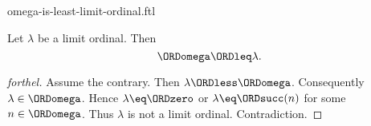 \documentclass{naproche-library}
\begin{document}
\begin{smodule}[title=$\omega$ is the Least Limit Ordinal]{omega-is-least-limit-ordinal.ftl}

\begin{proposition}[forthel,id=SET_THEORY_03_5517271459954688]
  Let $\lambda$ be a limit ordinal.
  Then \[ \ORDomega \ORDleq \lambda. \]
\end{proposition}
\begin{proof}[forthel]
  Assume the contrary.
  Then $\lambda \ORDless \ORDomega$.
  Consequently $\lambda \in \ORDomega$.
  Hence $\lambda \eq \ORDzero$ or $\lambda \eq \ORDsucc(n)$ for some $n \in \ORDomega$.
  Thus $\lambda$ is not a limit ordinal.
  Contradiction.
\end{proof}
\end{smodule}
\end{document}

